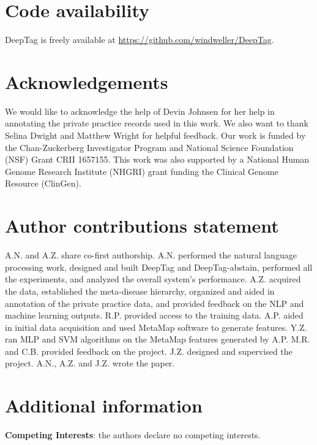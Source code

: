 \documentclass{article}[11pt,oneside]
\begin{document}
\section*{Code availability}
DeepTag is freely available at \url{https://github.com/windweller/DeepTag}.

\section*{Acknowledgements}

We would like to acknowledge the help of Devin Johnsen for her help in annotating the private practice records used in this work. We also want to thank Selina Dwight and Matthew Wright for helpful feedback. 
Our work is funded by the Chan-Zuckerberg Investigator Program and  National Science Foundation (NSF) Grant CRII 1657155.
This work was also supported by a National Human Genome Research Institute (NHGRI) grant funding the Clinical Genome
Resource (ClinGen).

\section*{Author contributions statement}

A.N. and A.Z. share co-first authorship. A.N. performed the natural language processing work, designed and built DeepTag and DeepTag-abstain, performed all the experiments, and analyzed the overall system's performance.  A.Z. acquired the data, established the meta-disease hierarchy, organized and aided in annotation of the private practice data, and provided feedback on the NLP and machine learning outputs. R.P. provided access to the training data. A.P. aided in initial data acquisition and used MetaMap software to generate features. Y.Z. ran MLP and SVM algorithms on the MetaMap features generated by A.P. M.R. and C.B. provided feedback on the project. J.Z. designed and supervised the project. A.N., A.Z. and J.Z. wrote the paper.

\section*{Additional information}
\textbf{Competing Interests}: the authors declare no competing interests.
\end{document}
